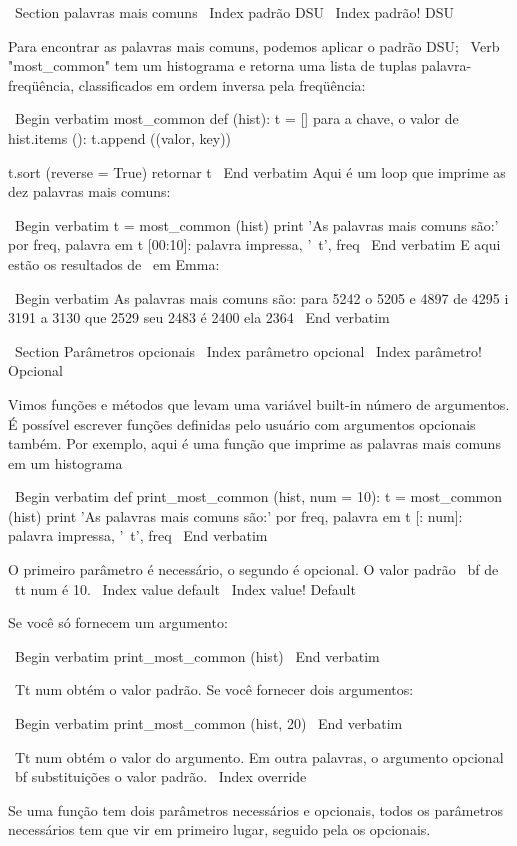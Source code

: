 \documentclass[10pt]{book}
\begin{document}
{{{{{{{{{\ Section {palavras mais comuns}
\ Index {padrão DSU}
\ Index {padrão! DSU}

Para encontrar as palavras mais comuns, podemos aplicar o padrão DSU;
\ Verb "most_common" tem um histograma e retorna uma lista de
tuplas palavra-freqüência, classificados em ordem inversa pela freqüência:

\ Begin {verbatim}
most_common def (hist):
    t = []
    para a chave, o valor de hist.items ():
        t.append ((valor, key))

    t.sort (reverse = True)
    retornar t
\ End {verbatim}
%
Aqui é um loop que imprime as dez palavras mais comuns:

\ Begin {verbatim}
t = most_common (hist)
print 'As palavras mais comuns são:'
por freq, palavra em t [00:10]:
    palavra impressa, '\ t', freq
\ End {verbatim}
%
E aqui estão os resultados de {\ em Emma}:

\ Begin {verbatim}
As palavras mais comuns são:
para 5242
o 5205
e 4897
de 4295
i 3191
a 3130
que 2529
seu 2483
é 2400
ela 2364
\ End {verbatim}
%

\ Section {Parâmetros opcionais}
\ Index {parâmetro opcional}
\ Index {parâmetro! Opcional}

Vimos funções e métodos que levam uma variável built-in
número de argumentos. É possível escrever funções definidas pelo usuário
com argumentos opcionais também. Por exemplo, aqui é uma função que
imprime as palavras mais comuns em um histograma

\ Begin {verbatim}
def print_most_common (hist, num = 10):
    t = most_common (hist)
    print 'As palavras mais comuns são:'
    por freq, palavra em t [: num]:
        palavra impressa, '\ t', freq
\ End {verbatim}

O primeiro parâmetro é necessário, o segundo é opcional.
O valor padrão {\ bf} de {\ tt num} é 10.
\ Index {value default}
\ Index {value! Default}

Se você só fornecem um argumento:

\ Begin {verbatim}
print_most_common (hist)
\ End {verbatim}

{\ Tt num} obtém o valor padrão. Se você fornecer dois argumentos:

\ Begin {verbatim}
print_most_common (hist, 20)
\ End {verbatim}

{\ Tt num} obtém o valor do argumento. Em outra
palavras, o argumento opcional {\ bf substituições} o valor padrão.
\ Index {override}

Se uma função tem dois parâmetros necessários e opcionais, todos
os parâmetros necessários tem que vir em primeiro lugar, seguido pela
os opcionais.


}}}}}}}}}
\end{document}
